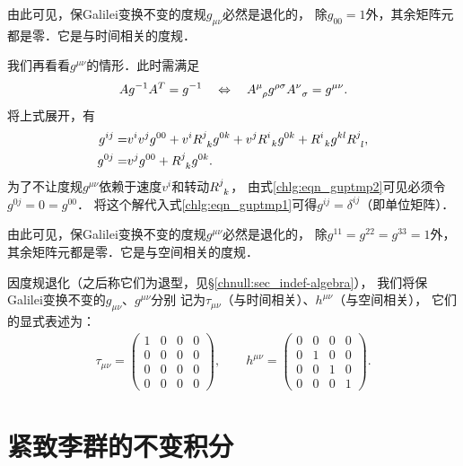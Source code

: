 由此可见，保Galilei变换不变的度规$g_{\mu\nu}$必然是退化的，
除$g_{00}=1$外，其余矩阵元都是零．它是与时间相关的度规．

我们再看看$g^{\mu\nu}$的情形．此时需满足
\begin{equation}
	A g^{-1} A^T = g^{-1} \quad \Leftrightarrow \quad
	A^{\mu}_{\hphantom{\mu}\rho} g^{\rho\sigma} A^{\nu}_{\hphantom{\mu}\sigma} = g^{\mu\nu}.
\end{equation}
将上式展开，有
\begin{align}
    g^{i j}= & v^i v^j g^{00}+ v^{i} R^{j}_{\hphantom{j}k } g^{0 k} + v^{j} R^{i}_{\hphantom{j} k} g^{0 k}  
     +R^i_{\hphantom{j}k} g^{kl} R^j_{\hphantom{j}l} , \label{chlg:eqn_guptmp1} \\
	g^{0 j}= & v^j g^{00}+R^j_{\hphantom{j}k} g^{0 k} . \label{chlg:eqn_guptmp2}  
\end{align}
为了不让度规$g^{\mu\nu}$依赖于速度$v^i$和转动$R^j_{\hphantom{j}k}$，
由式\eqref{chlg:eqn_guptmp2}可见必须令$g^{0j}=0=g^{00}$．
将这个解代入式\eqref{chlg:eqn_guptmp1}可得$g^{ij}=\delta^{ij}$（即单位矩阵）．

由此可见，保Galilei变换不变的度规$g^{\mu\nu}$必然是退化的，
除$g^{11}=g^{22}=g^{33}=1$外，其余矩阵元都是零．它是与空间相关的度规．

因度规退化（之后称它们为{\kaishu 退型}，见\S\ref{chnull:sec_indef-algebra}），
我们将保Galilei变换不变的$g_{\mu\nu}$、$g^{\mu\nu}$分别
记为$\tau_{\mu\nu}$（与时间相关）、$h^{\mu\nu}$（与空间相关），
它们的显式表述为：
\begin{align}
\tau_{\mu \nu}=\left(\begin{array}{cccc}
	1 & 0 & 0 & 0 \\
	0 & 0 & 0 & 0 \\
	0 & 0 & 0 & 0 \\
	0 & 0 & 0 & 0
\end{array}\right), \qquad 
h^{\mu \nu}=\left(\begin{array}{cccc}
	0 & 0 & 0 & 0 \\
	0 & 1 & 0 & 0 \\
	0 & 0 & 1 & 0 \\
	0 & 0 & 0 & 1
\end{array}\right) .	
\end{align}



\section{紧致李群的不变积分}\label{chlg:sec_Integral}

